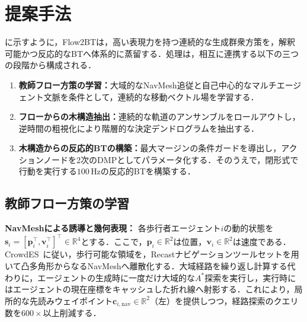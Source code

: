 \documentclass{sice-si}
\begin{document}
\section{提案手法}
に示すように，Flow2BTは，高い表現力を持つ連続的な生成群衆方策を，解釈可能かつ反応的なBTへ体系的に蒸留する．処理は，相互に連携する以下の三つの段階から構成される．
\begin{enumerate}[label=\arabic*), labelsep=0.5em]
    \item \textbf{教師フロー方策の学習：}大域的なNavMesh追従と自己中心的なマルチエージェント文脈を条件として，連続的な移動ベクトル場を学習する．
    \item \textbf{フローからの木構造抽出：}連続的な軌道のアンサンブルをロールアウトし，逆時間の粗視化により階層的な決定デンドログラムを抽出する．
    \item \textbf{木構造からの反応的BTの構築：}最大マージンの条件ガードを導出し，アクションノードを2次のDMPとしてパラメータ化する．そのうえで，閉形式で行動を実行する$100\,\text{Hz}$の反応的BTを構築する．
\end{enumerate}

\subsection{教師フロー方策の学習}
\textbf{NavMeshによる誘導と幾何表現：}
各歩行者エージェント$i$の動的状態を$\mathbf{s}_i = [\mathbf{p}_i^\top, \mathbf{v}_i^\top]^\top \in \mathbb{R}^4$とする．ここで，$\mathbf{p}_i \in \mathbb{R}^2$は位置，$\mathbf{v}_i \in \mathbb{R}^2$は速度である．CrowdES~\cite{bae2025crowdes}に従い，歩行可能な領域を，Recastナビゲーションツールセット\cite{mononen2009recast}を用いて凸多角形からなるNavMeshへ離散化する．大域経路を繰り返し計算する代わりに，エージェントの生成時に一度だけ大域的な$A^*$探索を実行し，実行時にはエージェントの現在座標をキャッシュした折れ線へ射影する．これにより，局所的な先読みウェイポイント$\mathbf{c}_{i, \text{nav}} \in \mathbb{R}^2$（左）を提供しつつ，経路探索のクエリ数を$600\times$以上削減する．
\end{document}
